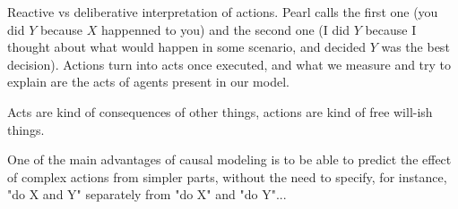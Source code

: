 Reactive vs deliberative interpretation of actions. Pearl calls the first one  (you did $Y$ because $X$ happenned to you) and the second one  (I did $Y$ because I thought about what would happen in some scenario, and decided $Y$ was the best decision). Actions turn into acts once executed, and what we measure and try to explain are the acts of agents present in our model.

Acts are kind of consequences of other things, actions are kind of free will-ish things.

One of the main advantages of causal modeling is to be able to predict the effect of complex actions from simpler parts, without the need to specify, for instance, "do X and Y" separately from "do X" and "do Y"...


